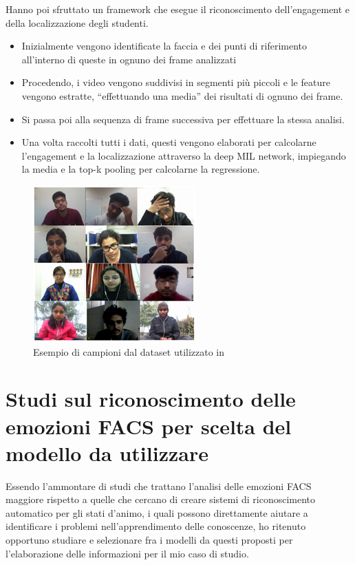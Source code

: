 Hanno poi sfruttato un framework che esegue il riconoscimento dell’engagement e della localizzazione degli studenti.
\begin{itemize}
    \item Inizialmente vengono identificate la faccia e dei punti di riferimento all’interno di queste in ognuno dei frame analizzati 
    \item Procedendo, i video vengono suddivisi in segmenti più piccoli e le feature vengono estratte, “effettuando una media” dei risultati di ognuno dei frame.
    \item Si passa poi alla sequenza di frame successiva per effettuare la stessa analisi.
    \item Una volta raccolti tutti i dati, questi vengono elaborati per calcolarne l’engagement e la localizzazione attraverso la deep MIL network, impiegando la media e la top-k pooling per calcolarne la regressione.
\end{itemize}


\begin{figure}
    \begin{center}    
        \includegraphics[width=0.8\linewidth]{images/4.png}
        \caption{Esempio di campioni dal dataset utilizzato in \cite{PredLocStudEngagInTheWild}}
    \end{center}
\end{figure}


\section{Studi sul riconoscimento delle emozioni FACS per scelta del modello da utilizzare}
Essendo l’ammontare di studi che trattano l’analisi delle emozioni FACS maggiore rispetto a quelle che cercano di creare sistemi di riconoscimento automatico per gli stati d’animo, i quali possono direttamente aiutare a identificare i problemi nell’apprendimento delle conoscenze, ho ritenuto opportuno studiare e selezionare fra i modelli da questi proposti per l’elaborazione delle informazioni per il mio caso di studio.


